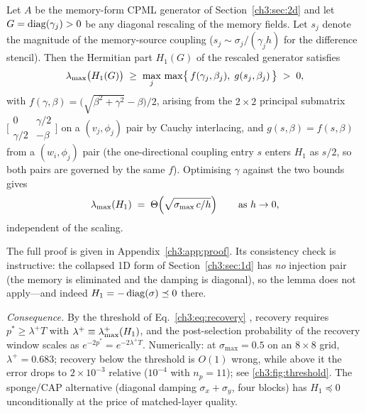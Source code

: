 \begin{lemma}
\label{ch3:lem:threshold}
Let $A$ be the memory-form CPML generator of Section~\ref{ch3:sec:2d} and let
$G=\operatorname{diag}(\gamma_j)>0$ be any diagonal rescaling of the memory fields.
Let $s_j$ denote the magnitude of the memory-source coupling
($s_j\sim\sigma_j/(\gamma_j h)$ for the difference stencil).  Then the
Hermitian part $H_1(G)$ of the rescaled generator satisfies
\begin{equation}
  \lamax\bigl(H_1(G)\bigr) \;\ge\;
  \max_j\, \max\bigl\{\, f(\gamma_j,\beta_j),\; g(s_j,\beta_j) \,\bigr\}
  \;>\; 0,
  \label{ch3:eq:lemmabound}
\end{equation}
with $f(\gamma,\beta) = \bigl(\sqrt{\beta^{2}+\gamma^{2}}-\beta\bigr)/2$,
arising from the $2\times2$ principal submatrix
$\bigl[\begin{smallmatrix} 0 & \gamma/2 \\ \gamma/2 & -\beta
\end{smallmatrix}\bigr]$
on a $(v_j,\phi_j)$ pair by Cauchy interlacing, and
$g(s,\beta) = f(s,\beta)$ from a $(w_i,\phi_j)$ pair (the one-directional
coupling entry $s$ enters $H_1$ as $s/2$, so both pairs are governed by
the same $f$).  Optimising $\gamma$ against the two bounds gives
\begin{equation}
  \lamax(H_1) \;=\; \Theta\!\left(\sqrt{\sigma_{\max}\,c/h}\right)
  \qquad \text{as } h\to0,
  \label{ch3:eq:lemmarate}
\end{equation}
independent of the scaling.
\end{lemma}

The full proof is given in Appendix~\ref{ch3:app:proof}.  Its consistency
check is instructive: the collapsed 1D form of Section~\ref{ch3:sec:1d} has
\emph{no} injection pair (the memory is eliminated and the damping is
diagonal), so the lemma does not apply---and indeed
$H_1=-\operatorname{diag}(\sigma)\preceq0$ there.

\emph{Consequence.}  By the threshold of Eq.~\eqref{ch3:eq:recovery}
\cite[Thm.~3.1]{jin2024recovery}, recovery requires
$p^{*}\ge\lambda^{+}T$ with $\lambda^{+}\equiv\lambda_{\max}^{+}(H_1)$, and the
post-selection probability of the recovery window scales as
$e^{-2p^{*}} = e^{-2\lambda^{+}T}$.  Numerically: at $\sigma_{\max}=0.5$
on an $8\times8$ grid, $\lambda^{+}=0.683$; recovery below the threshold
is $O(1)$ wrong, while above it the error drops to $2\times10^{-3}$
relative ($10^{-4}$ with $n_p=11$); see \ref{ch3:fig:threshold}.  The
sponge/CAP alternative (diagonal damping $\sigma_x+\sigma_y$, four
blocks) has $H_1\preceq0$ unconditionally at the price of matched-layer
quality.


